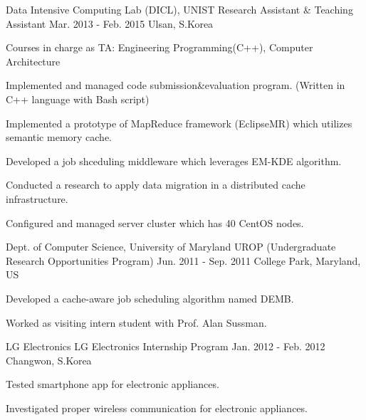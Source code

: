 \begin{cventries}

\cventry
{Data Intensive Computing Lab (DICL), UNIST} %
{Research Assistant \& Teaching Assistant} %
{Mar. 2013 - Feb. 2015} %
{Ulsan, S.Korea} %
{ %
\begin{cvitems}
\item {Courses in charge as TA: Engineering Programming(C++), Computer Architecture}
\item {Implemented and managed code submission\&evaluation program. (Written in C++ language with Bash script)}
\item {Implemented a prototype of MapReduce framework (EclipseMR) which utilizes semantic memory cache.}
\item {Developed a job shceduling middleware which leverages EM-KDE algorithm.}
\item {Conducted a research to apply data migration in a distributed cache infrastructure.}
\item {Configured and managed server cluster which has 40 CentOS nodes.}
\end{cvitems}
}


\cventry
{Dept. of Computer Science, University of Maryland} %
{UROP (Undergraduate Research Opportunities Program)} %
{Jun. 2011 - Sep. 2011} %
{College Park, Maryland, US} %
{ %
\begin{cvitems}
\item {Developed a cache-aware job scheduling algorithm named DEMB.}
\item {Worked as visiting intern student with Prof. Alan Sussman.}
\end{cvitems}
}


\cventry
{LG Electronics} %
{LG Electronics Internship Program} %
{Jan. 2012 - Feb. 2012} %
{Changwon, S.Korea} %
{ %
\begin{cvitems}
\item {Tested smartphone app for electronic appliances.}
\item {Investigated proper wireless communication for electronic appliances.}
\end{cvitems}
}


\end{cventries}
